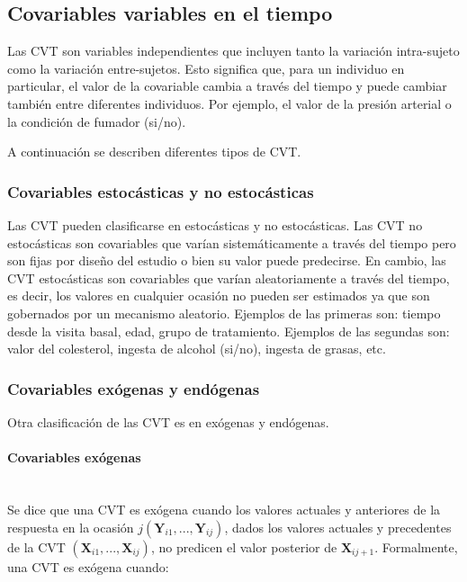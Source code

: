 \documentclass[spanish]{article}
\numberwithin{figure}{subsection}
\numberwithin{equation}{subsection}
\numberwithin{table}{subsection}
\begin{document}
\subsection{Covariables variables en el tiempo}

Las CVT son variables independientes que incluyen tanto la variación
intra-sujeto como la variación entre-sujetos. Esto significa que, para un
individuo en particular, el valor de la covariable cambia a través del tiempo y
puede cambiar también entre diferentes individuos. Por ejemplo, el valor de la
presión arterial o la condición de fumador (si/no).

A continuación se describen diferentes tipos de CVT.

\subsubsection{Covariables estocásticas y no estocásticas}

Las CVT pueden clasificarse en estocásticas y no estocásticas. Las CVT no
estocásticas son covariables que varían sistemáticamente a través del tiempo
pero son fijas por diseño del estudio o bien su valor puede predecirse. En
cambio, las CVT estocásticas son covariables que varían aleatoriamente a través
del tiempo, es decir, los valores en cualquier ocasión no pueden ser estimados
ya que son gobernados por un mecanismo aleatorio. Ejemplos de las primeras son:
tiempo desde la visita basal, edad, grupo de tratamiento. Ejemplos de las
segundas son: valor del colesterol, ingesta de alcohol (si/no), ingesta de
grasas, etc.

\subsubsection{Covariables exógenas y endógenas}

Otra clasificación de las CVT es en exógenas y endógenas.

\paragraph{Covariables exógenas} \mbox{} \\

Se dice que una CVT es
exógena cuando los valores actuales y anteriores de la respuesta en la ocasión
$j (\bm{Y}_{i1}, ..., \bm{Y}_{ij})$, dados los valores actuales y precedentes de
la CVT $(\bm{X}_{i1}, ..., \bm{X}_{ij})$, no predicen el valor posterior de
$\bm{X}_{ij+1}$. Formalmente, una CVT es exógena cuando:
\end{document}
